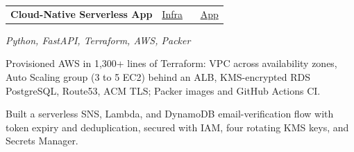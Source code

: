 \documentclass[letterpaper,10pt]{article}
\makeatletter
\newcommand{\bi}[1]{\item {\fontsize{9.2}{10.8}\selectfont #1}}
\newcommand{\proj}[3]{%
  \vspace{2pt}\noindent\begin{tabular*}{\linewidth}{@{}l@{\extracolsep{\fill}}r@{}}
  \textbf{#1} & #2\\\end{tabular*}\par
  {\itshape\small #3}\par\vspace{-1pt}}
\makeatother
\begin{document}
\proj{Cloud-Native Serverless App}{\href{https://github.com/KeerthanaDeviGovindaraj/tf-infra-fork}{Infra} \ \textbar\ \ \href{https://github.com/KeerthanaDeviGovindaraj/webapp-FORK}{App}}
     {Python, FastAPI, Terraform, AWS, Packer}
\begin{bullets}
  \bi{Provisioned AWS in 1,300+ lines of Terraform: VPC across availability zones, Auto Scaling group (3 to 5 EC2) behind an ALB, KMS-encrypted RDS PostgreSQL, Route53, ACM TLS; Packer images and GitHub Actions CI.}
  \bi{Built a serverless SNS, Lambda, and DynamoDB email-verification flow with token expiry and deduplication, secured with IAM, four rotating KMS keys, and Secrets Manager.}
\end{bullets}
\end{document}
